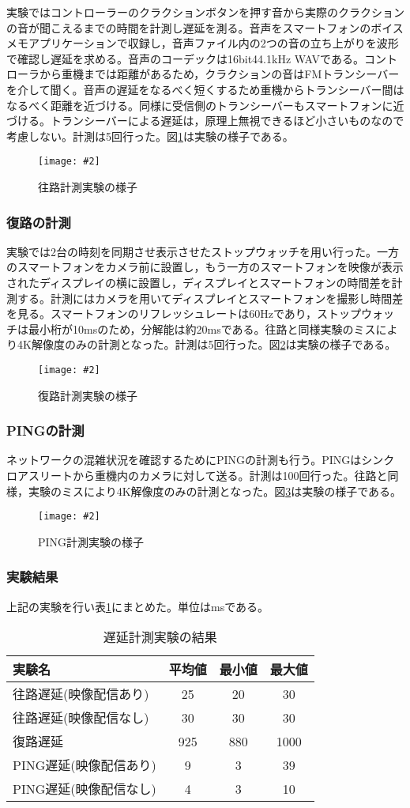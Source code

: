 \documentclass[a4paper,12pt]{jsarticle}
\newcommand{\figuref}[1]{図\ref{#1}}
\newcommand{\tabref}[1]{表\ref{#1}}
\newcommand{\fig}[4][width=\textwidth]{
    \begin{figure}[!h]
    \begin{center}
    \texttt{[image: \#2]}
    \caption{#3}
    \label{#4}
    \vspace*{-1cm}
    \end{center}
    \end{figure}
}
\begin{document}
実験ではコントローラーのクラクションボタンを押す音から実際のクラクションの音が聞こえるまでの時間を計測し遅延を測る。音声をスマートフォンのボイスメモアプリケーションで収録し，音声ファイル内の2つの音の立ち上がりを波形で確認し遅延を求める。音声のコーデックは16bit44.1kHz WAVである。コントローラから重機までは距離があるため，クラクションの音はFMトランシーバーを介して聞く。音声の遅延をなるべく短くするため重機からトランシーバー間はなるべく距離を近づける。同様に受信側のトランシーバーもスマートフォンに近づける。トランシーバーによる遅延は，原理上無視できるほど小さいものなので考慮しない。計測は5回行った。\figuref{test_tx}は実験の様子である。
\clearpage
\fig[width=7cm]{image/test_tx.jpg}{往路計測実験の様子}{test_tx}

\subsubsection{復路の計測}
実験では2台の時刻を同期させ表示させたストップウォッチを用い行った。一方のスマートフォンをカメラ前に設置し，もう一方のスマートフォンを映像が表示されたディスプレイの横に設置し，ディスプレイとスマートフォンの時間差を計測する。計測にはカメラを用いてディスプレイとスマートフォンを撮影し時間差を見る。スマートフォンのリフレッシュレートは60Hzであり，ストップウォッチは最小桁が10msのため，分解能は約20msである。往路と同様実験のミスにより4K解像度のみの計測となった。計測は5回行った。\figuref{test_rx}は実験の様子である。
\fig[width=7cm]{image/test_rx.jpg}{復路計測実験の様子}{test_rx}
\clearpage

\subsubsection{PINGの計測}
ネットワークの混雑状況を確認するためにPINGの計測も行う。PINGはシンクロアスリートから重機内のカメラに対して送る。計測は100回行った。往路と同様，実験のミスにより4K解像度のみの計測となった。\figuref{test_ping}は実験の様子である。
\fig[width=7cm]{image/test_ping.jpg}{PING計測実験の様子}{test_ping}

\subsubsection{実験結果}
上記の実験を行い\tabref{test_table}にまとめた。単位はmsである。

\begin{table}[htb]
\begin{center}
\caption{遅延計測実験の結果}
\label{test_table}
\begin{tabular}{l|c|c|c}
実験名 & 平均値 & 最小値 & 最大値 \\ \hline
往路遅延(映像配信あり) & 25 & 20 & 30 \\
往路遅延(映像配信なし) & 30 & 30 & 30 \\
復路遅延 & 925 & 880 & 1000 \\
PING遅延(映像配信あり) & 9 & 3 & 39 \\
PING遅延(映像配信なし) & 4 & 3 & 10 \\
\end{tabular}
\end{center}
\end{table}
\end{document}
